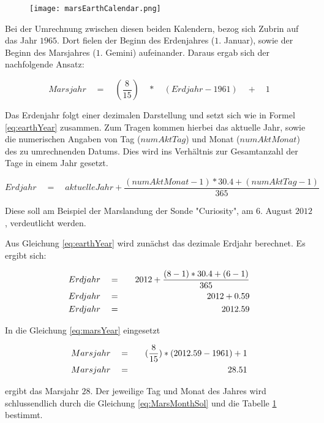 \begin{figure}[H]
	\centering
	\texttt{[image: marsEarthCalendar.png]}
	\label{fig:marsEarthCalendar}
\end{figure}

Bei der Umrechnung zwischen diesen beiden Kalendern, bezog sich Zubrin auf das
Jahr $1965$. Dort fielen der Beginn des Erdenjahres ($1.$ Januar), sowie der
Beginn des Marsjahres ($1.$ Gemini) aufeinander. Daraus ergab sich der
nachfolgende Ansatz:

\begin{equation}
	Marsjahr \quad = \quad (\frac{8}{15}) \quad * \quad (Erdjahr - 1961) \quad + \quad 1
	\label{eq:marsYear}
\end{equation}

Das Erdenjahr folgt einer dezimalen Darstellung und setzt sich wie in Formel
\ref{eq:earthYear} zusammen. Zum Tragen kommen hierbei das aktuelle Jahr, sowie
die numerischen Angaben von Tag ($numAktTag$) und Monat ($numAktMonat$) des zu
umrechnenden Datums. Dies wird ins Verhältnis zur Gesamtanzahl der Tage in einem
Jahr gesetzt.

\begin{equation}
	Erdjahr \quad = \quad aktuelleJahr + \frac{ (numAktMonat - 1) * 30.4 + (numAktTag - 1) }{365}
	\label{eq:earthYear}
\end{equation}

Diese soll am Beispiel der Marslandung der Sonde "Curiosity", am $6.$ August
$2012$, verdeutlicht werden.

Aus Gleichung \ref{eq:earthYear} wird zunächst das dezimale Erdjahr berechnet.
Es ergibt sich:

\begin{eqnarray}
	Erdjahr \quad & = & \quad 2012 + \frac{ (8-1) * 30.4 + (6-1) }{365} \notag\\
	Erdjahr \quad & = & \quad 2012 + 0.59 \notag\\
	Erdjahr \quad & = & \quad 2012.59
\end{eqnarray}

In die Gleichung \ref{eq:marsYear} eingesetzt

\begin{eqnarray}
	Marsjahr \quad & = & \quad (\frac{8}{15}) * (2012.59 - 1961) + 1 \notag\\
	Marsjahr \quad & = & \quad 28.51
\end{eqnarray}

ergibt das Marsjahr $28$. Der jeweilige Tag und Monat des Jahres wird
schlussendlich durch die Gleichung \ref{eq:MarsMonthSol} und die Tabelle
\ref{fig:marsEarthCalendar} bestimmt.

